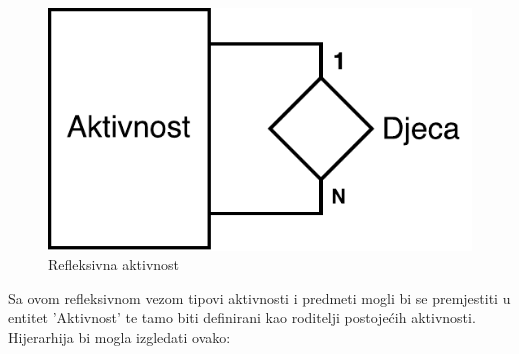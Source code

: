 \documentclass[times, utf8, zavrsni]{fer}
\begin{document}
\begin{enumerate}[leftmargin=*]
\begin{figure}[H]
\centering
\includegraphics[scale=0.5]{img/refleksivna-aktivnost.pdf}
\caption{Refleksivna aktivnost}
\label{fig:refleksivna-aktivnost}
\end{figure}

Sa ovom refleksivnom vezom tipovi aktivnosti i predmeti mogli bi se premjestiti u entitet 'Aktivnost' te tamo biti definirani kao roditelji postojećih aktivnosti. Hijerarhija bi mogla izgledati ovako:


\end{enumerate}
\end{document}
